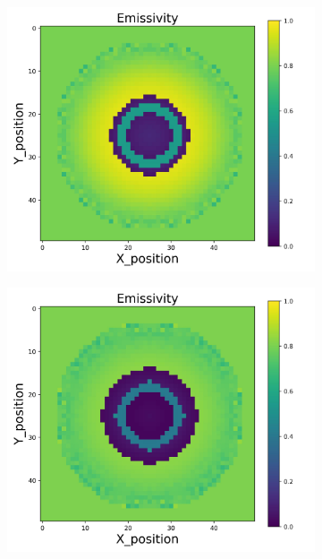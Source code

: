 {\begin{figure}[p]
\begin{minipage}{\textwidth}
\begin{subfigure}{0.325\textwidth}
        \end{subfigure}
        \begin{subfigure}{0.325\textwidth}
            \centering
            \includegraphics[width=\textwidth]{figures/raw_data/23/quad/emi_cal.jpg}
        \end{subfigure}
        \begin{subfigure}{0.325\textwidth}
            \centering
            \includegraphics[width=\textwidth]{figures/raw_data/24/quad/emi_cal.jpg}

\end{subfigure}
\end{minipage}
\end{figure}}
